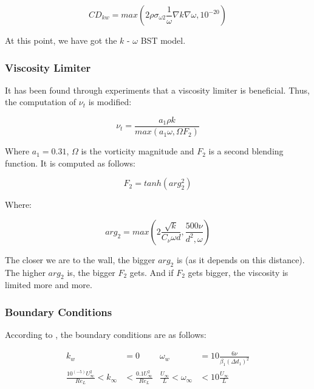 \begin{equation}
    \label{eq:cdkw}
    CD_{kw} = max \left( 
    2 \rho \sigma_{\omega 2} \frac{1}{\omega} \nabla k \nabla \omega, 10^{-20} 
    \right)
\end{equation}

\noindent At this point, we have got the $k$ - $\omega$ BST model.


\subsubsection{Viscosity Limiter}
 It has been found through experiments that a viscosity limiter is beneficial.
 Thus, the computation of $\nu_t$ is modified:

\begin{equation}
    \nu_t = \frac{a_1 \rho k}{max(a_1 \omega, \Omega F_2)}
\end{equation}

\noindent Where $a_1 = 0.31$, $\Omega$ is the vorticity magnitude  and $F_2$ is
a second blending function. It is computed as follows:

\begin{equation}
    F_2 = tanh(arg_2^2)
\end{equation}

\noindent Where:

\begin{equation}
    arg_2 = max \left( 2\frac{\sqrt{k}}{C_{\nu} \omega d},
    \frac{500 \nu}{d^2, \omega}\right)
\end{equation}

\noindent The closer we are to the wall, the bigger $arg_2$ is (as it depends on
this distance). The higher $arg_2$ is, the bigger $F_2$ gets. And if $F_2$ gets
bigger, the viscosity is limited more and more.


\subsubsection{Boundary Conditions}
\label{subsubsec:sst_bcs}
According to \cite{nasatmr}, the boundary conditions are as follows:

\begin{align*}
    k_{w}       &= 0 &
    \omega_{w}  &= 10 \frac{6 \nu}{\beta_1 (\Delta d_1)^2} \\
    \frac{10^(-5) U_{\infty}^2}{Re_L} < k_{\infty} &< 
    \frac{0.1 U_{\infty}^2}{Re_L} &
%
    \frac{U_{\infty}}{L} < \omega_{\infty} &<
    10 \frac{U_{\infty}}{L}
\end{align*}

